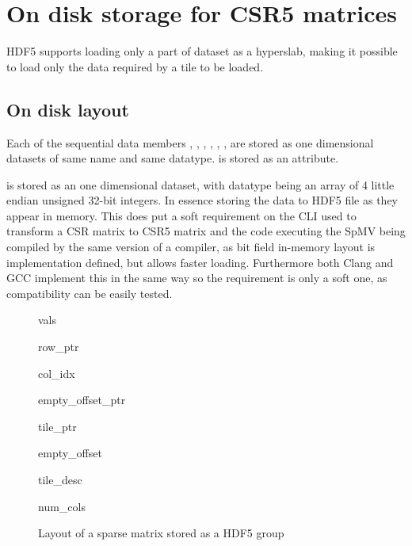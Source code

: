 \documentclass[thesis=M,english]{FITthesis}[2019/12/23]
\begin{document}
\chapter{On disk storage for CSR5 matrices}

HDF5 supports loading only a part of dataset as a hyperslab, making it possible to load only the data
required by a tile to be loaded.




\section{On disk layout}


Each of the sequential data members , , , ,
, , are stored as one dimensional datasets of same name
and same datatype.  is stored as an attribute.

 is stored as an one dimensional dataset, with datatype being
an array of 4 little endian unsigned 32-bit integers. In essence storing the data to HDF5 file as
they appear in memory. This does put a soft requirement on the CLI used to transform a CSR matrix to
CSR5 matrix and the code executing the SpMV being compiled by the same version of a compiler, as
bit field in-memory layout is implementation defined, but allows faster loading. Furthermore both
Clang and GCC implement this in the same way so the requirement is only a soft one, as compatibility can
be easily tested.

\begin{figure}[!h]
    \begin{tcolorbox}[title=/A, colback=gray!30!white]
        \begin{infobox}[colback=hdtsc]
            vals
        \end{infobox}
        \begin{infobox}[colback=hdtsc]
            row\_ptr
        \end{infobox}
        \begin{infobox}[colback=hdtsc]
            col\_idx
        \end{infobox}
        \begin{infobox}[colback=hdtsc, width=0.3\textwidth]
            empty\_offset\_ptr
        \end{infobox}
        \begin{infobox}[colback=hdtsc]
            tile\_ptr
        \end{infobox}
        \begin{infobox}[colback=hdtsc]
            empty\_offset
        \end{infobox}
        \begin{infobox}[colback=hdtsc]
            tile\_desc
        \end{infobox}
        \begin{infobox}[colback=hdatc, width=0.2\textwidth]
            num\_cols
        \end{infobox}
    \end{tcolorbox}
    \caption{Layout of a sparse matrix stored as a HDF5 group}
\end{figure}
\end{document}
